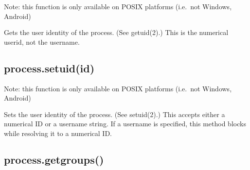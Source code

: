 Note: this function is only available on POSIX platforms (i.e.~not
Windows, Android)

Gets the user identity of the process. (See getuid(2).) This is the
numerical userid, not the username.

\begin{Shaded}
\begin{Highlighting}[]
 \NormalTok{(}\NormalTok{) \{}
  \NormalTok{(} \NormalTok{+ }\NormalTok{());}
\NormalTok{\}}
\end{Highlighting}
\end{Shaded}

\subsection{process.setuid(id)}

Note: this function is only available on POSIX platforms (i.e.~not
Windows, Android)

Sets the user identity of the process. (See setuid(2).) This accepts
either a numerical ID or a username string. If a username is specified,
this method blocks while resolving it to a numerical ID.

\begin{Shaded}
\begin{Highlighting}[]
 \NormalTok{(} \NormalTok{&& }\NormalTok{) \{}
  \NormalTok{(} \NormalTok{+ }\NormalTok{());}
   \NormalTok{\{}
    \NormalTok{(}\NormalTok{);}
    \NormalTok{(} \NormalTok{+ }\NormalTok{());}
  \NormalTok{\}}
   
    \NormalTok{(} 
  \NormalTok{\}}
\NormalTok{\}}
\end{Highlighting}
\end{Shaded}

\subsection{process.getgroups()}

